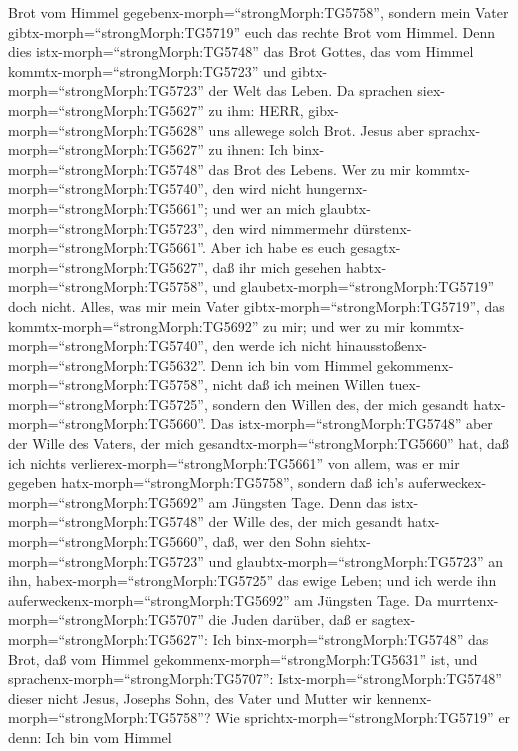 Brot vom Himmel gegebenx-morph=``strongMorph:TG5758'', sondern mein
Vater gibtx-morph=``strongMorph:TG5719'' euch das rechte Brot vom
Himmel.  Denn dies istx-morph=``strongMorph:TG5748'' das
Brot Gottes, das vom Himmel kommtx-morph=``strongMorph:TG5723'' und
gibtx-morph=``strongMorph:TG5723'' der Welt das Leben.  Da
sprachen siex-morph=``strongMorph:TG5627'' zu ihm: HERR,
gibx-morph=``strongMorph:TG5628'' uns allewege solch Brot. 
Jesus aber sprachx-morph=``strongMorph:TG5627'' zu ihnen: Ich
binx-morph=``strongMorph:TG5748'' das Brot des Lebens. Wer zu mir
kommtx-morph=``strongMorph:TG5740'', den wird nicht
hungernx-morph=``strongMorph:TG5661''; und wer an mich
glaubtx-morph=``strongMorph:TG5723'', den wird nimmermehr
dürstenx-morph=``strongMorph:TG5661''.  Aber ich habe es
euch gesagtx-morph=``strongMorph:TG5627'', daß ihr mich gesehen
habtx-morph=``strongMorph:TG5758'', und
glaubetx-morph=``strongMorph:TG5719'' doch nicht.  Alles,
was mir mein Vater gibtx-morph=``strongMorph:TG5719'', das
kommtx-morph=``strongMorph:TG5692'' zu mir; und wer zu mir
kommtx-morph=``strongMorph:TG5740'', den werde ich nicht
hinausstoßenx-morph=``strongMorph:TG5632''.  Denn ich bin
vom Himmel gekommenx-morph=``strongMorph:TG5758'', nicht daß ich meinen
Willen tuex-morph=``strongMorph:TG5725'', sondern den Willen des, der
mich gesandt hatx-morph=``strongMorph:TG5660''.  Das
istx-morph=``strongMorph:TG5748'' aber der Wille des Vaters, der mich
gesandtx-morph=``strongMorph:TG5660'' hat, daß ich nichts
verlierex-morph=``strongMorph:TG5661'' von allem, was er mir gegeben
hatx-morph=``strongMorph:TG5758'', sondern daß ich's
auferweckex-morph=``strongMorph:TG5692'' am Jüngsten Tage. 
Denn das istx-morph=``strongMorph:TG5748'' der Wille des, der mich
gesandt hatx-morph=``strongMorph:TG5660'', daß, wer den Sohn
siehtx-morph=``strongMorph:TG5723'' und
glaubtx-morph=``strongMorph:TG5723'' an ihn,
habex-morph=``strongMorph:TG5725'' das ewige Leben; und ich werde ihn
auferweckenx-morph=``strongMorph:TG5692'' am Jüngsten Tage.
 Da murrtenx-morph=``strongMorph:TG5707'' die Juden
darüber, daß er sagtex-morph=``strongMorph:TG5627'': Ich
binx-morph=``strongMorph:TG5748'' das Brot, daß vom Himmel
gekommenx-morph=``strongMorph:TG5631'' ist,  und
sprachenx-morph=``strongMorph:TG5707'':
Istx-morph=``strongMorph:TG5748'' dieser nicht Jesus, Josephs Sohn, des
Vater und Mutter wir kennenx-morph=``strongMorph:TG5758''? Wie
sprichtx-morph=``strongMorph:TG5719'' er denn: Ich bin vom Himmel
